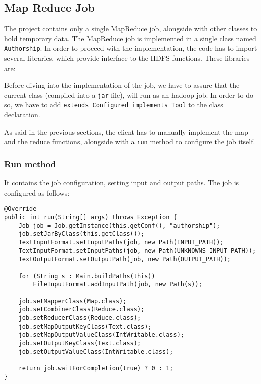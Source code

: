 \documentclass[a4paper,11pt, twoside]{article}
\begin{document}
	\subsection{Map Reduce Job}
		The project contains only a single MapReduce job, alongside with other classes to hold temporary data. The MapReduce job is implemented in a single class named \lstinline|Authorship|. In order to proceed with the implementation, the code has to import several libraries, which provide interface to the HDFS functions. These libraries are:
		\begin{figure}[H]
		\end{figure}

		Before diving into the implementation of the job, we have to assure that the current class (compiled into a \verb|jar| file), will run as an hadoop job. In order to do so, we have to add \lstinline|extends Configured implements Tool| to the class declaration.
		
		\bigskip
		\noindent
		As said in the previous sections, the client has to manually implement the map and the reduce functions, alongside with a \lstinline|run| method to configure the job itself.

	\subsubsection{Run method}
		It contains the job configuration, setting input and output paths.
		The job is configured as follows:
	
	\begin{lstlisting}[firstnumber=48, caption={Run method}, captionpos=b]
@Override
public int run(String[] args) throws Exception {
	Job job = Job.getInstance(this.getConf(), "authorship");
	job.setJarByClass(this.getClass());
	TextInputFormat.setInputPaths(job, new Path(INPUT_PATH));
	TextInputFormat.setInputPaths(job, new Path(UNKNOWNS_INPUT_PATH));
	TextOutputFormat.setOutputPath(job, new Path(OUTPUT_PATH));
	
	for (String s : Main.buildPaths(this))
		FileInputFormat.addInputPath(job, new Path(s));
	
	job.setMapperClass(Map.class);
	job.setCombinerClass(Reduce.class);
	job.setReducerClass(Reduce.class);
	job.setMapOutputKeyClass(Text.class);
	job.setMapOutputValueClass(IntWritable.class);
	job.setOutputKeyClass(Text.class);
	job.setOutputValueClass(IntWritable.class);
	
	return job.waitForCompletion(true) ? 0 : 1;
}
	\end{lstlisting}
	
\end{document}
